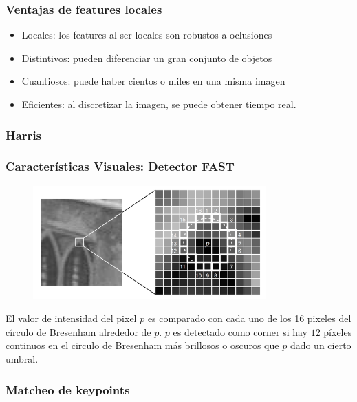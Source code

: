\begin{frame}
	\frametitle{Ventajas de features locales}
	\footnotesize

	\begin{itemize}
	\item Locales: los features al ser locales son robustos a oclusiones
	\item Distintivos: pueden diferenciar un gran conjunto de objetos
	\item Cuantiosos: puede haber cientos o miles en una misma imagen
	\item Eficientes: al discretizar la imagen, se puede obtener tiempo real.
\end{itemize}
	
\end{frame}

\begin{frame}
	\frametitle{Harris}
	\footnotesize
	
	
\end{frame}

\begin{frame}
	\frametitle{Características Visuales: Detector FAST}
	
	\begin{figure}
		\includegraphics[width=0.8\textwidth]{./images/camera/fast}
	\end{figure}
	
	El valor de intensidad del pixel $p$ es comparado con cada uno de los 16 pixeles del círculo de Bresenham alrededor de $p$. $p$ es detectado como corner si hay $12$ píxeles continuos en el circulo de Bresenham más brillosos o oscuros que $p$ dado un cierto umbral.
\end{frame}

\begin{frame}
	\frametitle{Matcheo de keypoints}
	\footnotesize
	
\end{frame}


